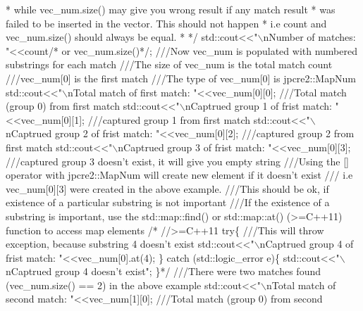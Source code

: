\begin{DoxyCode}
\textcolor{comment}{* while vec\_num.size() may give you wrong result if any match result}
\textcolor{comment}{* was failed to be inserted in the vector. This should not happen}
\textcolor{comment}{* i.e count and vec\_num.size() should always be equal.}
\textcolor{comment}{* */}
std::cout<<\textcolor{stringliteral}{"\(\backslash\)nNumber of matches: "}<<count\textcolor{comment}{/* or vec\_num.size()*/};
\textcolor{comment}{}
\textcolor{comment}{///Now vec\_num is populated with numbered substrings for each match}
\textcolor{comment}{///The size of vec\_num is the total match count}
\textcolor{comment}{///vec\_num[0] is the first match}
\textcolor{comment}{///The type of vec\_num[0] is jpcre2::MapNum}
\textcolor{comment}{}std::cout<<\textcolor{stringliteral}{"\(\backslash\)nTotal match of first match: "}<<vec\_num[0][0];      \textcolor{comment}{///Total match (group 0) from first match}
\textcolor{comment}{}std::cout<<\textcolor{stringliteral}{"\(\backslash\)nCaptrued group 1 of frist match: "}<<vec\_num[0][1]; \textcolor{comment}{///captured group 1 from first match }
\textcolor{comment}{}std::cout<<\textcolor{stringliteral}{"\(\backslash\)nCaptrued group 2 of frist match: "}<<vec\_num[0][2]; \textcolor{comment}{///captured group 2 from first match}
\textcolor{comment}{}std::cout<<\textcolor{stringliteral}{"\(\backslash\)nCaptrued group 3 of frist match: "}<<vec\_num[0][3]; \textcolor{comment}{///captured group 3 doesn't exist, it will
       give you empty string}
\textcolor{comment}{}\textcolor{comment}{///Using the [] operator with jpcre2::MapNum will create new element if it doesn't exist}
\textcolor{comment}{}\textcolor{comment}{/// i.e vec\_num[0][3] were created in the above example.}
\textcolor{comment}{}\textcolor{comment}{///This should be ok, if existence of a particular substring is not important}
\textcolor{comment}{}\textcolor{comment}{}
\textcolor{comment}{///If the existence of a substring is important, use the std::map::find() or std::map::at() (>=C++11)
       function to access map elements}
\textcolor{comment}{}\textcolor{comment}{/* //>=C++11}
\textcolor{comment}{try\{}\textcolor{comment}{}
\textcolor{comment}{    ///This will throw exception, because substring 4 doesn't exist}
\textcolor{comment}{}    std::cout<<"\(\backslash\)nCaptrued group 4 of frist match: "<<vec\_num[0].at(4);
\} catch (std::logic\_error e)\{
    std::cout<<"\(\backslash\)nCaptrued group 4 doesn't exist";
\}*/
\textcolor{comment}{}
\textcolor{comment}{///There were two matches found (vec\_num.size() == 2) in the above example}
\textcolor{comment}{}std::cout<<\textcolor{stringliteral}{"\(\backslash\)nTotal match of second match: "}<<vec\_num[1][0];      \textcolor{comment}{///Total match (group 0) from second
}
\end{DoxyCode}
